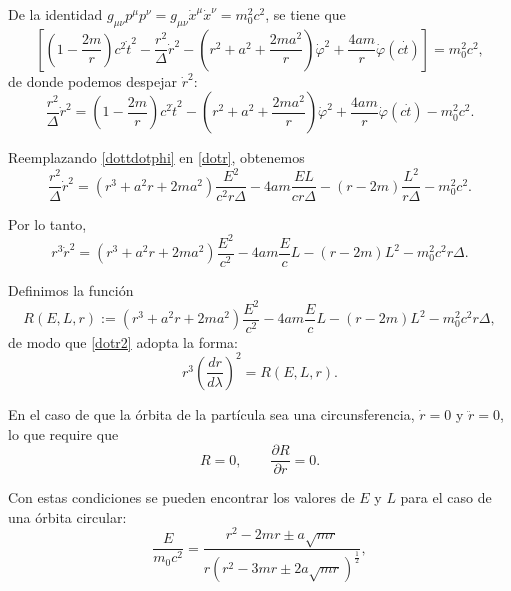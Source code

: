 De la identidad $g_{\mu \nu}p^{\mu} p^{\nu}=g_{\mu \nu}\dot{x}^{\mu}\dot{x}^{\nu}=m_0^2c^2$, se tiene que 
\begin{equation}\label{pp=m2c2}
\left[\left(1-\frac{2m}{r}\right)c^2\dot{t}^2-\frac{r^2}{\Delta}\dot{r}^2-\left(r^2+a^2+\frac{2ma^2}{r}\right)\dot{\varphi}^2
+\frac{4am}{r}\dot{\varphi}(c\dot{t}) \right]=m_0^2c^2,
\end{equation}
de donde podemos despejar $\dot{r}^2$:
\begin{equation}\label{dotr}
\frac{r^2}{\Delta}\dot{r}^2=\left(1-\frac{2m}{r}\right)c^2\dot{t}^2-\left(r^2+a^2+\frac{2ma^2}{r}\right)\dot{\varphi}^2
+\frac{4am}{r}\dot{\varphi}(c\dot{t}) -m_0^2c^2.
\end{equation}

Reemplazando \eqref{dottdotphi} en \eqref{dotr}, obtenemos
\begin{equation}
\frac{r^2}{\Delta}\dot{r}^2=\left( r^3+a^2r+2ma^2\right)\frac{E^2}{c^2r\Delta}-4am\frac{EL}{cr\Delta}-\left(r-2m\right)\frac{L^2}{r\Delta}-m_0^2c^2.
\end{equation}

Por lo tanto,
\begin{equation}\label{dotr2}
r^3\dot{r}^2=\left( r^3+a^2r+2ma^2\right)\frac{E^2}{c^2}-4am\frac{E}{c}L-\left(r-2m\right)L^2-m_0^2c^2r\Delta .
\end{equation}

Definimos la funci\'on
\begin{equation}\label{R}
R(E,L,r):=\left( r^3+a^2r+2ma^2\right)\frac{E^2}{c^2}-4am\frac{E}{c}L-\left(r-2m\right)L^2-m_0^2c^2r\Delta,
\end{equation}
de modo que \eqref{dotr2} adopta la forma:
\begin{equation}
r^3\left(\frac{dr}{d\lambda}\right)^2=R(E,L,r).
\end{equation}

En el caso de que la \'orbita de la part\'icula sea una circunsferencia, $\dot{r}=0$ y $\ddot{r}=0$, lo que require que 
\begin{equation}
R=0, \qquad \frac{\partial R}{\partial r}=0.
\end{equation}

Con estas condiciones se pueden encontrar los valores de $E$ y $L$ para el caso de una \'orbita circular:
\begin{equation}
\frac{E}{m_0c^2}=\frac{r^2-2mr\pm a\sqrt{mr}}{r\left(r^2-3mr\pm 2a\sqrt{mr}\right)^{\frac{1}{2}}} , \label{Ekerr}
\end{equation}

